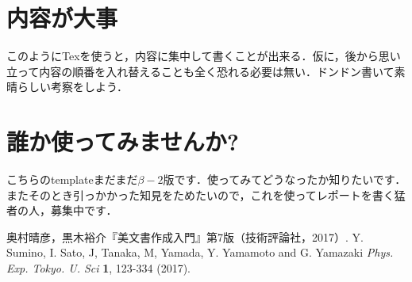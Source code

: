 \documentclass[12 pt,a4paper,autodetect-engine]{jsarticle}
\begin{document}
\section{内容が大事}
このようにTexを使うと，内容に集中して書くことが出来る．仮に，後から思い立って内容の順番を入れ替えることも全く恐れる必要は無い．ドンドン書いて素晴らしい考察をしよう．

\section{誰か使ってみませんか?}
こちらのtemplateまだまだ$\beta-2$版です．使ってみてどうなったか知りたいです．またそのとき引っかかった知見をためたいので，これを使ってレポートを書く猛者の人，募集中です．

\begin{thebibliography}{99}
	 奥村晴彦，黒木裕介『\LaTeXe 美文書作成入門』第7版（技術評論社，2017）.
	 Y. Sumino, I. Sato, J, Tanaka, M, Yamada, Y. Yamamoto and G. Yamazaki {\it Phys. Exp. Tokyo. U. Sci} {\bf 1}, 123-334 (2017).

\end{thebibliography}
\end{document}
